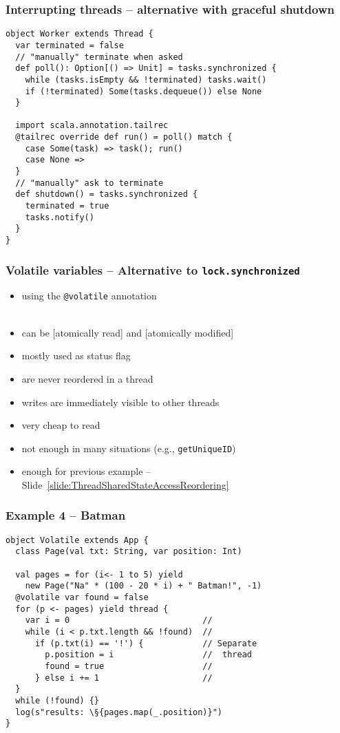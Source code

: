 \documentclass[aspectratio=169]{beamer}
\begin{document}
\begin{frame}[fragile]\frametitle{Interrupting threads -- alternative with \alert{graceful shutdown}}
    
\begin{lstlisting}[emph={sleep,log,thread,join,synchronized,wait,notify,shutdown,terminated}]
object Worker extends Thread {
  var terminated = false
  // "manually" terminate when asked
  def poll(): Option[() => Unit] = tasks.synchronized {
    while (tasks.isEmpty && !terminated) tasks.wait()
    if (!terminated) Some(tasks.dequeue()) else None
  }

  import scala.annotation.tailrec
  @tailrec override def run() = poll() match {
    case Some(task) => task(); run()
    case None =>
  }
  // "manually" ask to terminate
  def shutdown() = tasks.synchronized {
    terminated = true
    tasks.notify()
  }
}
\end{lstlisting}

\end{frame}


\begin{frame}\frametitle{Volatile variables -- Alternative to \texttt{lock.synchronized}}
\begin{itemize}
  \item using the \texttt{\alert{@volatile}} annotation
  \\~
  \item can be [atomically read] and [atomically modified]
  \item mostly used as status flag
  \item are never reordered in a thread
  \item writes are immediately visible to other threads
  \item very cheap to read
  \item not enough in many situations (e.g., \texttt{getUniqueID})
  \item enough for previous example -- Slide~\ref{slide:ThreadSharedStateAccessReordering}
\end{itemize}
\end{frame}

\begin{frame}[fragile]\frametitle{Example 4 -- Batman}
\begin{lstlisting}[emph={sleep,log,thread,join,synchronized,wait,notify,volatile,found}]
object Volatile extends App {
  class Page(val txt: String, var position: Int)

  val pages = for (i<- 1 to 5) yield
    new Page("Na" * (100 - 20 * i) + " Batman!", -1)
  @volatile var found = false
  for (p <- pages) yield thread {       
    var i = 0                           // 
    while (i < p.txt.length && !found)  // 
      if (p.txt(i) == '!') {            // Separate
        p.position = i                  //  thread
        found = true                    // 
      } else i += 1                     // 
  }
  while (!found) {}
  log(s"results: \§{pages.map(_.position)}")
}
\end{lstlisting}
\end{frame}
\end{document}
